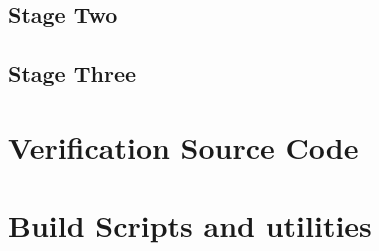         \subsection{Stage Two}
                
                   
        
        \subsection{Stage Three}
        
        

    \section{Verification Source Code}
        
        
        
        
    
    \section{Build Scripts and utilities}
        
        
        

